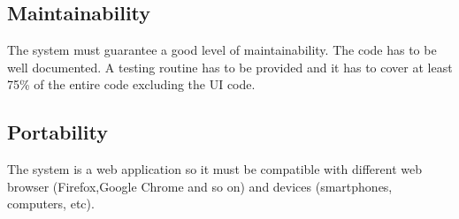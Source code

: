 \subsection{Maintainability}The system must guarantee a good level of maintainability. The code has to be well documented. A testing routine has to be provided and it has to cover at least 75\% of the entire code excluding the UI code.
\subsection{Portability}
The system is a web application so it must be compatible with different web browser (Firefox,Google Chrome and so on) and devices (smartphones, computers, etc).




